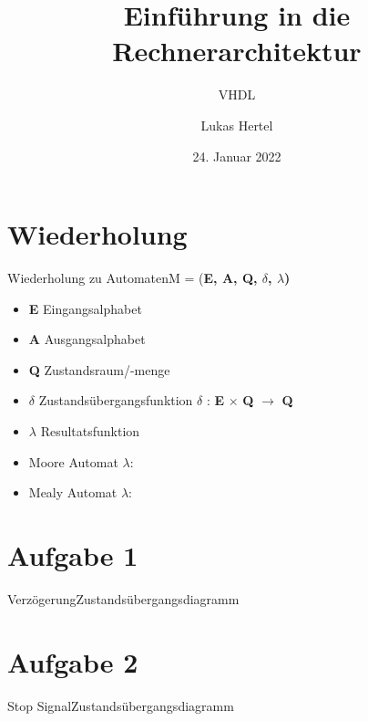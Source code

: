 \documentclass[
  german,            %
  aspectratio=169,    %
  sectionpage=false,   %
]{tumbeamer}
\title{Einführung in die Rechnerarchitektur}
\subtitle{VHDL}
\author{Lukas Hertel}
\institute{\theChairName\\\theDepartmentName\\\theUniversityName}
\date[24.01.2022]{24. Januar 2022}
\begin{document}
\maketitle

\section{Wiederholung}
\begin{frame}{Wiederholung zu Automaten}{M = (\textbf{E, A, Q, $\delta$, $\lambda$)}}
\begin{itemize}
  \item \textbf{E} Eingangsalphabet
  \item \textbf{A} Ausgangsalphabet
  \item \textbf{Q} Zustandsraum/-menge
  \item $\delta$ Zustandsübergangsfunktion $\delta$ : \textbf{E} $\times$ \textbf{Q} $\rightarrow$ \textbf{Q}
  \item $\lambda$ Resultatsfunktion
  \item Moore Automat $\lambda$:
  \item Mealy Automat $\lambda$:
\end{itemize}
\end{frame}
\section{Aufgabe 1}
\begin{frame}{Verzögerung}{Zustandsübergangsdiagramm}
  
\end{frame}
\section{Aufgabe 2}
\begin{frame}{Stop Signal}{Zustandsübergangsdiagramm}
  
\end{frame}
\end{document}
